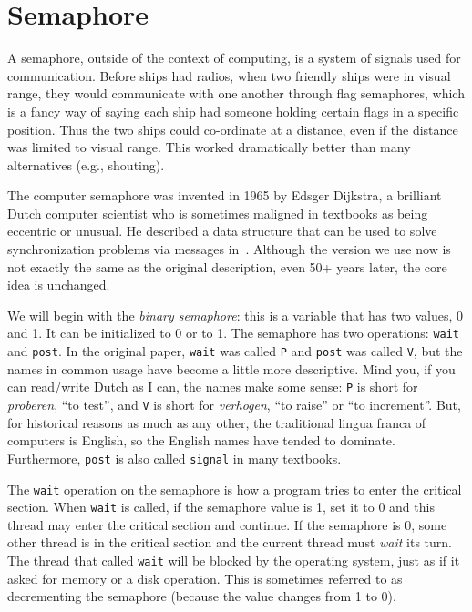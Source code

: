 




\section*{Semaphore}
A semaphore, outside of the context of computing, is a system of signals used for communication. Before ships had radios, when two friendly ships were in visual range, they would communicate with one another through flag semaphores, which is a fancy way of saying each ship had someone holding certain flags in a specific position. Thus the two ships could co-ordinate at a distance, even if the distance was limited to visual range. This worked dramatically better than many alternatives (e.g., shouting).

The computer semaphore was invented in 1965 by Edsger Dijkstra, a brilliant Dutch computer scientist who is sometimes maligned in textbooks as being eccentric or unusual. He described a data structure that can be used to solve synchronization problems via messages in~\cite{semaphores}. Although the version we use now is not exactly the same as the original description, even 50+ years later, the core idea is unchanged.

We will begin with the \textit{binary semaphore}: this is a variable that has two values, 0 and 1. It can be initialized to 0 or to 1. The semaphore has two operations: \texttt{wait} and \texttt{post}. In the original paper, \texttt{wait} was called \texttt{P} and \texttt{post} was called \texttt{V}, but the names in common usage have become a little more descriptive. Mind you, if you can read/write Dutch as I can, the names make some sense: \texttt{P} is short for \textit{proberen}, ``to test'', and \texttt{V} is short for \textit{verhogen}, ``to raise'' or ``to increment''. But, for historical reasons as much as any other, the traditional lingua franca of computers is English, so the English names have tended to dominate. Furthermore, \texttt{post} is also called \texttt{signal} in many textbooks.

The \texttt{wait} operation on the semaphore is how a program tries to enter the critical section. When \texttt{wait} is called, if the semaphore value is 1, set it to 0 and this thread may enter the critical section and continue. If the semaphore is 0, some other thread is in the critical section and the current thread must \textit{wait} its turn. The thread that called \texttt{wait} will be blocked by the operating system, just as if it asked for memory or a disk operation. This is sometimes referred to as decrementing the semaphore (because the value changes from 1 to 0).

